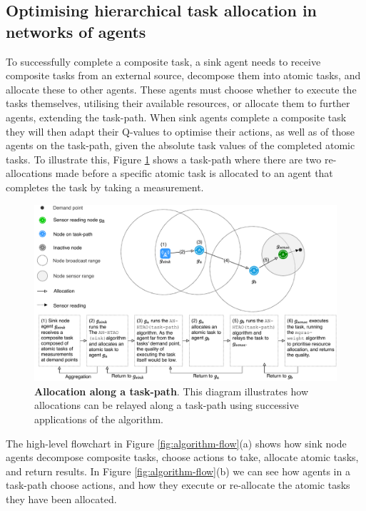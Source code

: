 \newcommand{\functionANHTAO}[2]{
	\functionSignature{\texttt{anhtao-path}}{\varAtomicTask{}{}, \varAgent{}{}}
}

\subsection{Optimising hierarchical task allocation in networks of agents}

To successfully complete a composite task, a sink agent needs to receive composite tasks from an external source, decompose them into atomic tasks, and allocate these to other agents. These agents must choose whether to execute the tasks themselves, utilising their available resources, or allocate them to further agents, extending the task-path.  When sink agents complete a composite task they will then adapt their Q-values to optimise their actions, as well as of those agents on the task-path, given the absolute task values of the completed atomic tasks. To illustrate this, Figure \ref{fig:arc-flow} shows a task-path where there are two re-allocations made before a specific atomic task is allocated to an agent that completes the task by taking a measurement.
\begin{figure}[ht]
	\centering
	\includegraphics[width=0.8\linewidth, trim={72pt 0pt 62pt 0pt, clip}]{arc-flow}
	\caption{\textbf{Allocation along a task-path}. This diagram illustrates how allocations can be relayed along a task-path using successive applications of the \acronymATARIA{}{} algorithm.}
	\label{fig:arc-flow}
\end{figure}
The high-level flowchart in Figure \ref{fig:algorithm-flow}(a) shows how sink node agents decompose composite tasks, choose actions to take, allocate atomic tasks, and return results. In Figure \ref{fig:algorithm-flow}(b) we can see how agents in a task-path choose actions, and how they execute or re-allocate the atomic tasks they have been allocated.

